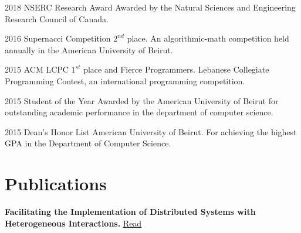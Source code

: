 \documentclass{tccv}
\begin{document}
\begin{yearlist}

\item{2018}
     {NSERC Research Award}
     {Awarded by the Natural Sciences and Engineering Research Council of Canada.}


\item{2016}
     {Supernacci Competition}
     {$2^{nd}$ place. An algorithmic-math competition held annually in the American University of Beirut.} 
\item{2015}
     {ACM LCPC}
     {$1^{st}$ place and Fierce Programmers. Lebanese Collegiate Programming Contest, an international programming competition.}

\item{2015}
     {Student of the Year}
     {Awarded by the American University of Beirut for outstanding academic performance in the department of computer science.}

\item{2015}
     {Dean's Honor List}
     {American University of Beirut. For achieving the highest GPA in the Department of Computer Science.}

\end{yearlist}

    
\section{Publications}
\textbf{Facilitating the Implementation of Distributed Systems with Heterogeneous Interactions.} \href{https://link.springer.com/chapter/10.1007/978-3-319-98938-9_15?fbclid=IwAR3mB_0l1FImySHqTeFfwwBxNwwAB3lfXOTerruuuzMAQN9nHZKYdGKVSzk}{Read}
\end{document}
